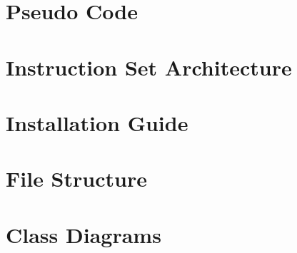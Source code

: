 \documentclass[a4paper,10pt,twoside]{report}
\begin{document}


%



\begin{appendices}
\chapter{Pseudo Code}\label{appendix:A}

\chapter{Instruction Set Architecture}\label{appendix:isa}

\chapter{Installation Guide}\label{appendix:C}

\chapter{File Structure}\label{appendix:D}

\chapter{Class Diagrams}\label{appendix:E}

\end{appendices}

\end{document}
